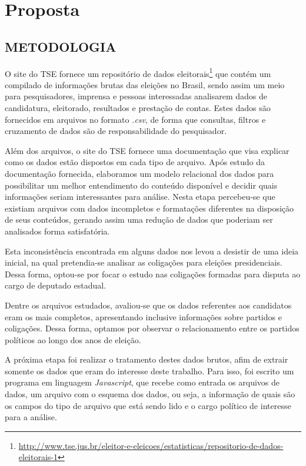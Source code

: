 \chapter{Proposta}
\label{proposta}

\section{\texorpdfstring{\MakeUppercase{Metodologia}}{}}
\label{proposta__metodologia}

O site do \gls{TSE} fornece um repositório de dados eleitorais\footnote{\url{http://www.tse.jus.br/eleitor-e-eleicoes/estatisticas/repositorio-de-dados-eleitorais-1}} que contém um compilado de informações brutas das eleições no Brasil, sendo assim um meio para pesquisadores, imprensa e pessoas interessadas analisarem dados de candidatura, eleitorado, resultados e prestação de contas. Estes dados são fornecidos em arquivos no formato \emph{.csv}, de forma que consultas, filtros e cruzamento de dados são de responsabilidade do pesquisador.

Além dos arquivos, o site do \gls{TSE} fornece uma documentação que visa explicar como os dados estão dispostos em cada tipo de arquivo. Após estudo da documentação fornecida, elaboramos um modelo relacional dos dados para possibilitar um melhor entendimento do conteúdo disponível e decidir quais informações seriam interessantes para análise. Nesta etapa percebeu-se que existiam arquivos com dados incompletos e formatações diferentes na disposição de seus conteúdos, gerando assim uma redução de dados que poderiam ser analisados forma satisfatória.

Esta inconsistência encontrada em alguns dados nos levou a desistir de uma ideia inicial, na qual pretendia-se analisar as coligações para eleições presidenciais. Dessa forma, optou-se por focar o estudo nas coligações formadas para disputa ao cargo de deputado estadual.

Dentre os arquivos estudados, avaliou-se que os dados referentes aos candidatos eram os mais completos, apresentando inclusive informações sobre partidos e coligações. Dessa forma, optamos por observar o relacionamento entre os partidos políticos ao longo dos anos de eleição.


A próxima etapa foi realizar o tratamento destes dados brutos, afim de extrair somente os dados que eram do interesse deste trabalho. Para isso, foi escrito um programa em linguagem \emph{Javascript}, que recebe como entrada os arquivos de dados, um arquivo com o esquema dos dados, ou seja, a informação de quais são os campos do tipo de arquivo que está sendo lido e o cargo político de interesse para a análise.

